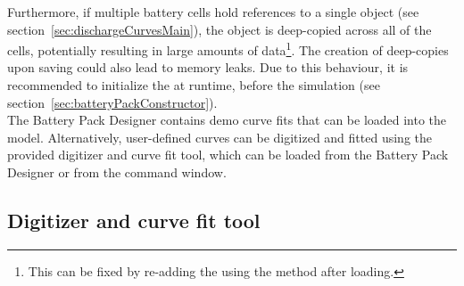 Furthermore, if multiple battery cells hold references to a single  object (see section~\ref{sec:dischargeCurvesMain}), the object is deep-copied across all of the cells, potentially resulting in large amounts of data\footnote{This can be fixed by re-adding the  using the  method after loading.}. The creation of deep-copies upon saving could also lead to memory leaks. Due to this behaviour, it is recommended to initialize the  at runtime, before the simulation (see section~\ref{sec:batteryPackConstructor}).\\
The Battery Pack Designer contains demo curve fits that can be loaded into the model. Alternatively, user-defined curves can be digitized and fitted using the provided digitizer and curve fit tool, which can be loaded from the Battery Pack Designer or from the command window.

\subsection{Digitizer and curve fit tool}
